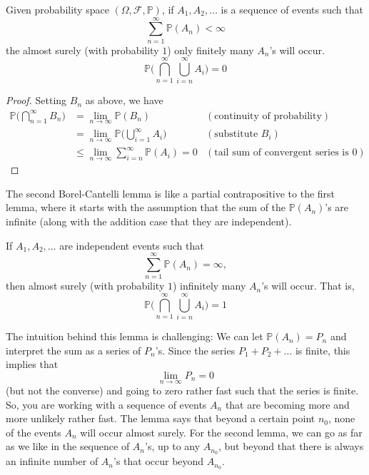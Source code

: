   \begin{lemma}
    Given probability space $(\Omega, \mathcal{F}, \mathbb{P})$, if $A_1, A_2, \ldots$ is a sequence of events such that 
    \begin{equation}
      \sum_{n=1}^\infty \mathbb{P}(A_n) < \infty
    \end{equation}
    the almost surely (with probability $1$) only finitely many $A_n$'s will occur. 
    \begin{equation}
      \mathbb{P} \bigg( \bigcap_{n=1}^\infty \bigcup_{i = n}^\infty A_i \bigg) = 0
    \end{equation}
  \end{lemma}
  \begin{proof}
    Setting $B_n$ as above, we have 
    \begin{align*}
      \mathbb{P}\bigg( \bigcap_{n=1}^\infty B_n \bigg) & = \lim_{n \rightarrow \infty} \mathbb{P}(B_n) & (\text{continuity of probability}) \\
      & = \lim_{n \rightarrow \infty} \mathbb{P} \bigg( \bigcup_{i=1}^\infty A_i \bigg) & (\text{substitute } B_i) \\
      & \leq \lim_{n \rightarrow \infty} \sum_{i = n}^\infty \mathbb{P}(A_i) = 0 & (\text{tail sum of convergent series is } 0)
    \end{align*}
  \end{proof}

  The second Borel-Cantelli lemma is like a partial contrapositive to the first lemma, where it starts with the assumption that the sum of the $\mathbb{P}(A_n)$'s are infinite (along with the addition case that they are independent). 

  \begin{lemma}
    If $A_1, A_2, \ldots$ are independent events such that 
    \begin{equation}
      \sum_{n=1}^\infty \mathbb{P}(A_n) = \infty,
    \end{equation}
    then almost surely (with probability $1$) infinitely many $A_n$'s will occur. That is, 
    \begin{equation}
      \mathbb{P} \bigg( \bigcap_{n=1}^\infty \bigcup_{i = n}^\infty A_i \bigg) = 1
    \end{equation}
  \end{lemma}

  The intuition behind this lemma is challenging: We can let $\mathbb{P}(A_n) = P_n$ and interpret the sum as a series of $P_n$'s. Since the series $P_1 + P_2 + \ldots$ is finite, this implies that 
  \begin{equation}
    \lim_{n \rightarrow \infty} P_n = 0
  \end{equation}
  (but not the converse) and going to zero rather fast such that the series is finite. So, you are working with a sequence of events $A_n$ that are becoming more and more unlikely rather fast. The lemma says that beyond a certain point $n_0$, none of the events $A_n$ will occur almost surely. For the second lemma, we can go as far as we like in the sequence of $A_n$'s, up to any $A_{n_0}$, but beyond that there is always an infinite number of $A_n$'s that occur beyond $A_{n_0}$. 

